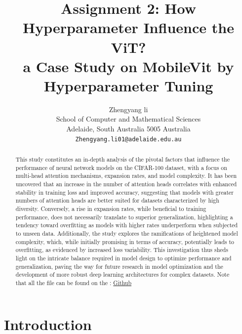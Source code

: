 \documentclass[10pt,twocolumn,letterpaper]{article}
\title{Assignment 2: How Hyperparameter Influence the ViT? \\
a Case Study on MobileVit by Hyperparameter Tuning}
\author{Zhengyang li\\
   School of Computer and Mathematical Sciences\\
   Adelaide, South Australia 5005 Australia\\
   \tt\small Zhengyang.li01@adelaide.edu.au}
\begin{document}
\maketitle

\begin{abstract}
   This study constitutes an in-depth analysis of the pivotal factors that influence the performance of neural network models on the CIFAR-100 dataset, with a focus on multi-head attention mechanisms, expansion rates, and model complexity. It has been uncovered that an increase in the number of attention heads correlates with enhanced stability in training loss and improved accuracy, suggesting that models with greater numbers of attention heads are better suited for datasets characterized by high diversity. Conversely, a rise in expansion rates, while beneficial to training performance, does not necessarily translate to superior generalization, highlighting a tendency toward overfitting as models with higher rates underperform when subjected to unseen data. Additionally, the study explores the ramifications of heightened model complexity, which, while initially promising in terms of accuracy, potentially leads to overfitting, as evidenced by increased loss variability. This investigation thus sheds light on the intricate balance required in model design to optimize performance and generalization, paving the way for future research in model optimization and the development of more robust deep learning architectures for complex datasets. Note that all the file can be found on the : \href{https://github.com/David-Lzy/Deep_Learning_Fundamentals}{Github}
\end{abstract}

\section{Introduction}
\end{document}
